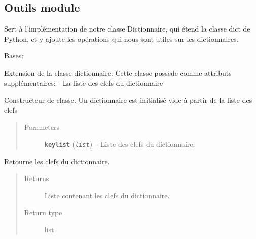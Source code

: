 \documentclass[letterpaper,10pt,english]{sphinxmanual}
\begin{document}
\subsection{Outils module}
\label{loganalyser:outils-module}\label{loganalyser:module-loganalyser.outils}
Sert à l'implémentation de notre classe Dictionnaire, qui étend la classe dict de Python, et y ajoute les opérations
qui nous sont utiles sur les dictionnaires.

\begin{fulllineitems}
\label{loganalyser:loganalyser.outils.Dictionary}
Bases: 

Extension de la classe dictionnaire. Cette classe possède comme attributs supplémentaires:
- La liste des clefs du dictionnaire

\begin{fulllineitems}
\label{loganalyser:loganalyser.outils.Dictionary.__init__}
Constructeur de classe. Un dictionnaire est initialisé vide à partir de la liste des clefs
\begin{quote}\begin{description}
\item[{Parameters}] \leavevmode
\textbf{\texttt{keylist}} (\emph{\texttt{list}}) -- Liste des clefs du dictionnaire.

\end{description}\end{quote}

\end{fulllineitems}


\begin{fulllineitems}
\label{loganalyser:loganalyser.outils.Dictionary.keys}
Retourne les clefs du dictionnaire.
\begin{quote}\begin{description}
\item[{Returns}] \leavevmode
Liste contenant les clefs du dictionnaire.

\item[{Return type}] \leavevmode
list


\end{description}
\end{quote}
\end{fulllineitems}
\end{fulllineitems}
\end{document}
